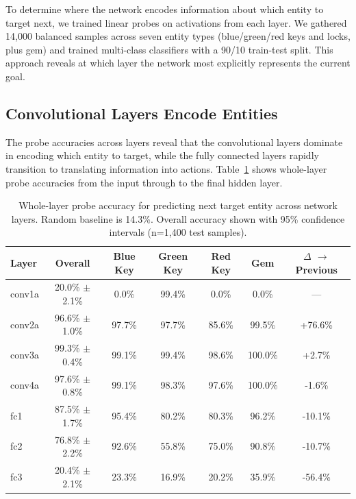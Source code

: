 To determine where the network encodes information about which entity to target next, we trained linear probes on activations from each layer. We gathered 14,000 balanced samples across seven entity types (blue/green/red keys and locks, plus gem) and trained multi-class classifiers with a 90/10 train-test split. This approach reveals at which layer the network most explicitly represents the current goal.

\subsection{Convolutional Layers Encode Entities}

The probe accuracies across layers reveal that the convolutional layers dominate in encoding which entity to target, while the fully connected layers rapidly transition to translating information into actions. Table~\ref{tab:probe_whole_layer} shows whole-layer probe accuracies from the input through to the final hidden layer.

\begin{table}[h]
    \caption[Whole-layer entity probe accuracy by layer]{Whole-layer probe accuracy for predicting next target entity across network layers. Random baseline is 14.3\%. Overall accuracy shown with 95\% confidence intervals (n=1,400 test samples).}
    \label{tab:probe_whole_layer}
    \hspace{-1.5cm}
    \begin{tabular}{lcccccc}
    \toprule
    \textbf{Layer} & \textbf{Overall} & \textbf{Blue Key} & \textbf{Green Key} & \textbf{Red Key} & \textbf{Gem} & \textbf{$\Delta$ $\rightarrow$ Previous} \\
    \midrule
    conv1a & 20.0\% $\pm$ 2.1\% & 0.0\% & 99.4\% & 0.0\% & 0.0\% & --- \\
    conv2a & 96.6\% $\pm$ 1.0\% & 97.7\% & 97.7\% & 85.6\% & 99.5\% & +76.6\% \\
    conv3a & 99.3\% $\pm$ 0.4\% & 99.1\% & 99.4\% & 98.6\% & 100.0\% & +2.7\% \\
    conv4a & 97.6\% $\pm$ 0.8\% & 99.1\% & 98.3\% & 97.6\% & 100.0\% & -1.6\% \\
    \midrule
    fc1 & 87.5\% $\pm$ 1.7\% & 95.4\% & 80.2\% & 80.3\% & 96.2\% & -10.1\% \\
    fc2 & 76.8\% $\pm$ 2.2\% & 92.6\% & 55.8\% & 75.0\% & 90.8\% & -10.7\% \\
    fc3 & 20.4\% $\pm$ 2.1\% & 23.3\% & 16.9\% & 20.2\% & 35.9\% & -56.4\% \\
    \bottomrule
    \end{tabular}
\end{table}

